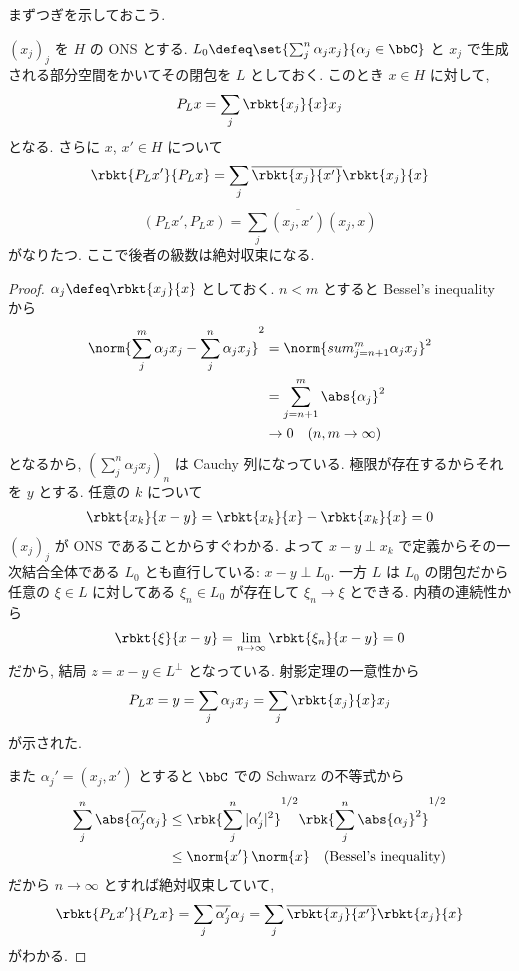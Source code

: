 \documentclass[openany, a4paper, oneside]{jsbook}
\begin{document}
まずつぎを示しておこう.
\begin{thm}
 $(x_j)_j$ を $H$ の ONS とする.
 $L_0 \defeq \set{\sum_j^n \alpha_j x_j}{\alpha_j \in \bbC}$
 と $x_j$ で生成される部分空間をかいてその閉包を $L$ としておく.
 このとき $x \in H$ に対して,
 \begin{align}
  P_L x
  =
  \sum_j \rbkt{x_j}{x} x_j
 \end{align}
 となる.
 さらに $x$, $x' \in H$ について
 \begin{align}
  \rbkt{P_L x'}{P_L x}
  =
  \sum_j \overline{\rbkt{x_j}{x'}} \rbkt{x_j}{x}
 \end{align}
 \[
 (P_Lx', P_Lx) = \sum_j \overline{(x_j, x')}(x_j, x)
 \]
 がなりたつ.
 ここで後者の級数は絶対収束になる.
\end{thm}
\begin{proof}
$\alpha_j \defeq \rbkt{x_j}{x}$ としておく.
$n<m$ とすると Bessel's inequality から
\begin{align}
 \norm{\sum_j^m \alpha_j x_j - \sum_j^n \alpha_j x_j}^2
 &=
 \norm{sum_{j=n+1}^m \alpha_j x_j}^2 \\
 &=
 \sum_{j=n+1}^m \abs{\alpha_j}^2 \\
 &\to
 0 \quad (n, m \to \infty)
\end{align}
となるから, $(\sum_j^n \alpha_j x_j)_n$ は Cauchy 列になっている.
極限が存在するからそれを $y$ とする.
任意の $k$ について
\begin{align}
 \rbkt{x_k}{x - y}
 =
 \rbkt{x_k}{x} - \rbkt{x_k}{x}
 =
 0
\end{align}
$(x_j)_j$ が ONS であることからすぐわかる.
よって $x-y \perp x_k$ で定義からその一次結合全体である $L_0$ とも直行している: $x-y \perp L_0$.
一方 $L$ は $L_0$ の閉包だから任意の $\xi \in L$ に対してある $\xi_n \in L_0$ が存在して $\xi_n \to \xi$ とできる.
内積の連続性から
\begin{align}
 \rbkt{\xi}{x - y}
 =
 \lim_{n \to \infty} \rbkt{\xi_n}{x - y}
 =
 0
\end{align}
だから, 結局 $z = x-y \in L^{\perp}$ となっている.
射影定理の一意性から
\begin{align}
 P_Lx
 =
 y
 =
 \sum_j \alpha_j x_j
 =
 \sum_j \rbkt{x_j}{x} x_j
\end{align}
が示された.

また $\alpha_j' = (x_j, x')$ とすると $\bbC$ での Schwarz の不等式から
\begin{align}
 \sum_j^n \abs{\overline{\alpha_j'} \alpha_j}
 &\le
 \rbk{\sum_j^n|\alpha_j'|^2}^{1/2}
  \rbk{\sum_j^n \abs{\alpha_j}^2}^{1/2} \\
 &\le
 \norm{x'} \, \norm{x}
 \quad \text{(Bessel's inequality)}
\end{align}
だから $n \to \infty$ とすれば絶対収束していて,
\begin{align}
 \rbkt{P_L x'}{P_L x}
 =
 \sum_j \overline{\alpha_j'} \alpha_j
 =
 \sum_j \overline{\rbkt{x_j}{x'}} \rbkt{x_j}{x}
\end{align}
がわかる.
\end{proof}
\end{document}
